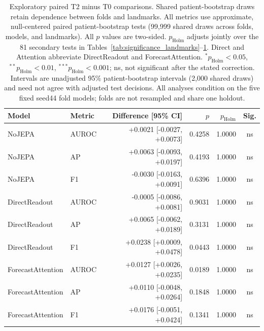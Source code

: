 \begin{table}[t]
\centering
\small
\caption{Exploratory paired T2 minus T0 comparisons. Shared patient-bootstrap draws retain dependence between folds and landmarks. All metrics use approximate, null-centered paired patient-bootstrap tests (99,999 shared draws across folds, models, and landmarks). All $p$ values are two-sided. $p_{\mathrm{Holm}}$ adjusts jointly over the 81 secondary tests in Tables~\ref{tab:significance_landmarks}--\ref{tab:significance_longitudinal}. Direct and Attention abbreviate DirectReadout and ForecastAttention. $^{*}p_{\mathrm{Holm}}<0.05$, $^{**}p_{\mathrm{Holm}}<0.01$, $^{***}p_{\mathrm{Holm}}<0.001$; ns, not significant after the stated correction. Intervals are unadjusted 95\% patient-bootstrap intervals (2,000 shared draws) and need not agree with adjusted test decisions. All analyses condition on the five fixed seed44 fold models; folds are not resampled and share one holdout.}
\label{tab:significance_longitudinal}
\begin{tabular}{llrrrc}
\toprule
Model & Metric & Difference [95\% CI] & $p$ & $p_{\mathrm{Holm}}$ & Sig. \\
\midrule
NoJEPA & AUROC & +0.0021 [-0.0027, +0.0073] & 0.4258 & 1.0000 & ns \\
NoJEPA & AP & +0.0063 [-0.0093, +0.0197] & 0.4193 & 1.0000 & ns \\
NoJEPA & F1 & -0.0030 [-0.0163, +0.0091] & 0.6396 & 1.0000 & ns \\
DirectReadout & AUROC & -0.0005 [-0.0086, +0.0081] & 0.9031 & 1.0000 & ns \\
DirectReadout & AP & +0.0065 [-0.0062, +0.0189] & 0.3131 & 1.0000 & ns \\
DirectReadout & F1 & +0.0238 [+0.0009, +0.0478] & 0.0443 & 1.0000 & ns \\
ForecastAttention & AUROC & +0.0127 [+0.0026, +0.0235] & 0.0189 & 1.0000 & ns \\
ForecastAttention & AP & +0.0110 [-0.0048, +0.0264] & 0.1848 & 1.0000 & ns \\
ForecastAttention & F1 & +0.0176 [-0.0051, +0.0424] & 0.1341 & 1.0000 & ns \\
\bottomrule
\end{tabular}
\end{table}
